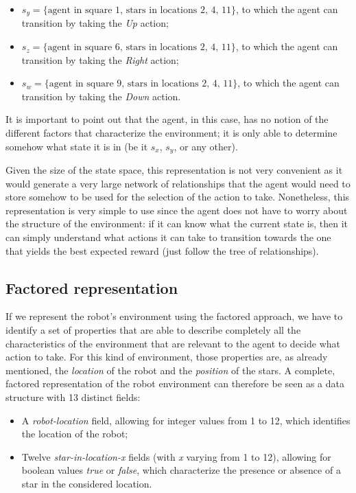 \documentclass[letterpaper,headings=standardclasses]{scrartcl}
\begin{document}
\begin{itemize}

\item $ s_y = \{ \text{agent in square 1, stars in locations 2, 4, 11} \} $, to which the agent can transition by taking the \emph{Up} action;

\item $ s_z = \{ \text{agent in square 6, stars in locations 2, 4, 11} \} $, to which the agent can transition by taking the \emph{Right} action;

\item $ s_w = \{ \text{agent in square 9, stars in locations 2, 4, 11} \} $, to which the agent can transition by taking the \emph{Down} action.

\end{itemize}

It is important to point out that the agent, in this case, has no notion of the different factors that characterize the environment; it is only able to determine somehow what state it is in (be it $s_x$, $s_y$, or any other).

Given the size of the state space, this representation is not very convenient as it would generate a very large network of relationships that the agent would need to store somehow to be used for the selection of the action to take. Nonetheless, this representation is very simple to use since the agent does not have to worry about the structure of the environment: if it can know what the current state is, then it can simply understand what actions it can take to transition towards the one that yields the best expected reward (just follow the tree of relationships).

\subsection{Factored representation}

If we represent the robot’s environment using the factored approach, we have to identify a set of properties that are able to describe completely all the characteristics of the environment that are relevant to the agent to decide what action to take. For this kind of environment, those properties are, as already mentioned, the \emph{location} of the robot and the \emph{position} of the stars. A complete, factored representation of the robot environment can therefore be seen as a data structure with 13 distinct fields:

\begin{itemize}

\item A \emph{robot-location} field, allowing for integer values from 1 to 12, which identifies the location of the robot;

\item Twelve \emph{star-in-location-x} fields (with \emph{x} varying from 1 to 12), allowing for boolean values \emph{true} or \emph{false}, which characterize the presence or absence of a star in the considered location.

\end{itemize}
\end{document}
